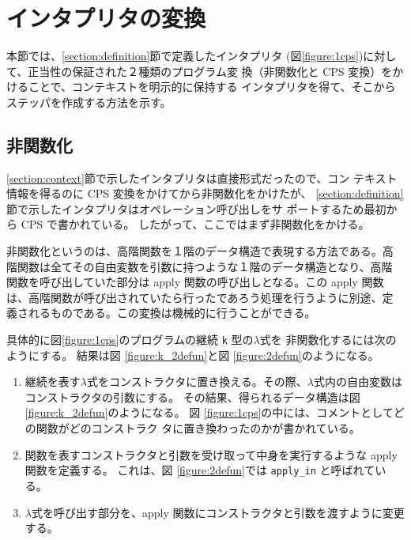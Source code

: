 \section{インタプリタの変換}
\label{section:transform}

本節では、\ref{section:definition}節で定義したインタプリタ
(図\ref{figure:1cps})に対して、正当性の保証された２種類のプログラム変
換（非関数化と CPS 変換）をかけることで、コンテキストを明示的に保持する
インタプリタを得て、そこからステッパを作成する方法を示す。


\subsection{非関数化}
\label{section:2defun}

\ref{section:context}節で示したインタプリタは直接形式だったので、コン
テキスト情報を得るのに CPS 変換をかけてから非関数化をかけたが、
\ref{section:definition}節で示したインタプリタはオペレーション呼び出しをサ
ポートするため最初から CPS で書かれている。
したがって、ここではまず非関数化をかける。

非関数化というのは、高階関数を１階のデータ構造で表現する方法である。高
階関数は全てその自由変数を引数に持つような１階のデータ構造となり、高階
関数を呼び出していた部分は apply 関数の呼び出しとなる。この apply 関数
は、高階関数が呼び出されていたら行ったであろう処理を行うように別途、定
義されるものである。この変換は機械的に行うことができる。

具体的に図\ref{figure:1cps}のプログラムの継続 \texttt{k} 型の$\lambda$式を
非関数化するには次のようにする。
結果は図 \ref{figure:k_2defun}と図 \ref{figure:2defun}のようになる。

\begin{enumerate}
\item 継続を表す$\lambda$式をコンストラクタに置き換える。その際、$\lambda$式内の自由変数はコンストラクタの引数にする。
その結果、得られるデータ構造は図 \ref{figure:k_2defun}のようになる。
図 \ref{figure:1cps}の中には、コメントとしてどの関数がどのコンストラク
タに置き換わったのかが書かれている。
\item 関数を表すコンストラクタと引数を受け取って中身を実行するような apply 関数を定義する。
これは、図 \ref{figure:2defun}では \texttt{apply\_in} と呼ばれている。
\item $\lambda$式を呼び出す部分を、apply 関数にコンストラクタと引数を渡すように変更する。
\end{enumerate}

